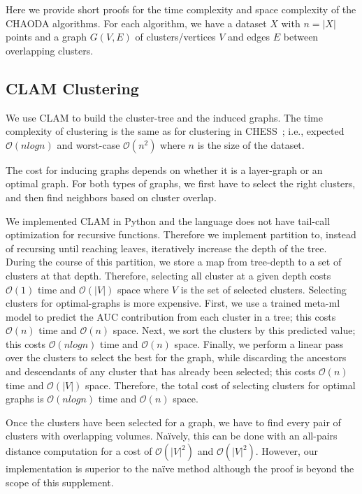 \documentclass{article}
\begin{document}
Here we provide short proofs for the time complexity and space complexity of the CHAODA algorithms.
For each algorithm, we have
a dataset $X$ with $n = |X|$ points and
a graph $G(V, E)$ of clusters/vertices $V$ and edges $E$ between overlapping clusters.


\subsection{CLAM Clustering}

We use CLAM to build the cluster-tree and the induced graphs.
The time complexity of clustering is the same as for clustering in CHESS~\cite{ishaq2019clustered}; i.e., expected $\mathcal{O}(nlogn)$ and worst-case $\mathcal{O}(n^2)$ where $n$ is the size of the dataset.

The cost for inducing graphs depends on whether it is a layer-graph or an optimal graph.
For both types of graphs, we first have to select the right clusters, and then find neighbors based on cluster overlap.

We implemented CLAM in Python and the language does not have tail-call optimization for recursive functions.
Therefore we implement partition to, instead of recursing until reaching leaves, iteratively increase the depth of the tree.
During the course of this partition, we store a map from tree-depth to a set of clusters at that depth.
Therefore, selecting all cluster at a given depth costs $\mathcal{O}(1)$ time and $\mathcal{O}(|V|)$ space where $V$ is the set of selected clusters.
Selecting clusters for optimal-graphs is more expensive.
First, we use a trained meta-ml model to predict the AUC contribution from each cluster in a tree; this costs $\mathcal{O}(n)$ time and $\mathcal{O}(n)$ space.
Next, we sort the clusters by this predicted value; this costs $\mathcal{O}(nlogn)$ time and $\mathcal{O}(n)$ space.
Finally, we perform a linear pass over the clusters to select the best for the graph, while discarding the ancestors and descendants of any cluster that has already been selected; this costs $\mathcal{O}(n)$ time and $\mathcal{O}(|V|)$ space.
Therefore, the total cost of selecting clusters for optimal graphs is $\mathcal{O}(nlogn)$ time and $\mathcal{O}(n)$ space.

Once the clusters have been selected for a graph, we have to find every pair of clusters with overlapping volumes.
Na\"ively, this can be done with an all-pairs distance computation for a cost of $\mathcal{O}(|V|^2)$ and $\mathcal{O}(|V|^2)$.
However, our implementation is superior to the na\"ive method although the proof is beyond the scope of this supplement.
\end{document}
